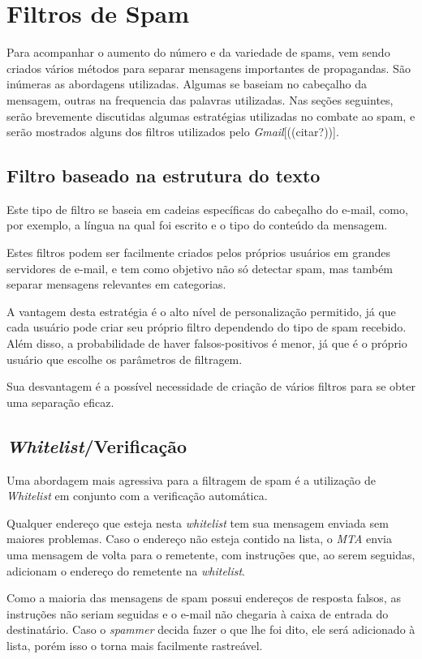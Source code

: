 \documentclass[a4paper,dvipdfm]{article}
\begin{document}
\section{Filtros de Spam}
	Para acompanhar o aumento do número e da variedade de spams, vem sendo criados vários métodos para separar mensagens importantes de propagandas.
	São inúmeras as abordagens utilizadas. 
	Algumas se baseiam no cabeçalho da mensagem, outras na frequencia das palavras utilizadas.
	Nas seções seguintes, serão brevemente discutidas algumas estratégias utilizadas no combate ao spam, e serão mostrados alguns dos filtros utilizados pelo \emph{Gmail}[((citar?))].

	\subsection{Filtro baseado na estrutura do texto}
		Este tipo de filtro se baseia em cadeias específicas do cabeçalho do e-mail, como, por exemplo, a língua na qual foi escrito e o tipo do conteúdo da mensagem.

		Estes filtros podem ser facilmente criados pelos próprios usuários em grandes servidores de e-mail, e tem como objetivo não só detectar spam, mas também separar mensagens relevantes em categorias.

		A vantagem desta estratégia é o alto nível de personalização permitido, já que cada usuário pode criar seu próprio filtro dependendo do tipo de spam recebido. 
		Além disso, a probabilidade de haver falsos-positivos é menor, já que é o próprio usuário que escolhe os parâmetros de filtragem.
		
		Sua desvantagem é a possível necessidade de criação de vários filtros para se obter uma separação eficaz.


	\subsection{\emph{Whitelist}/Verificação}
		Uma abordagem mais agressiva para a filtragem de spam é a utilização de \emph{Whitelist} em conjunto com a verificação automática.

		Qualquer endereço que esteja nesta \emph{whitelist} tem sua mensagem enviada sem maiores problemas.
		Caso o endereço não esteja contido na lista, o \emph{MTA} envia uma mensagem de volta para o remetente, com instruções que, ao serem seguidas, adicionam o endereço do remetente na \emph{whitelist}.

		Como a maioria das mensagens de spam possui endereços de resposta falsos, as instruções não seriam seguidas e o e-mail não chegaria à caixa de entrada do destinatário.
		Caso o \emph{spammer} decida fazer o que lhe foi dito, ele será adicionado à lista, porém isso o torna mais facilmente rastreável.
		
\end{document}
